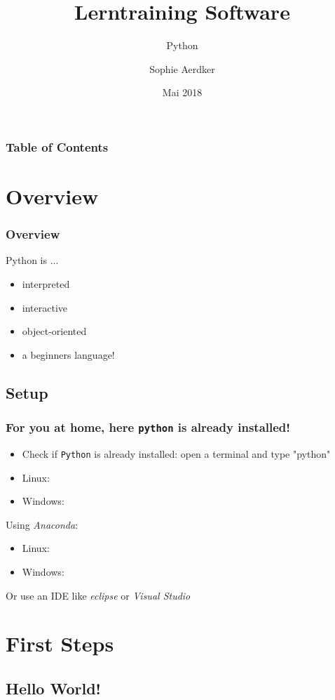 \documentclass{beamer}
\title{Lerntraining Software}
\subtitle{Python}
\author{Sophie Aerdker}
\institute{Ruhr-Universit\"at Bochum}
\date{Mai 2018}
\begin{document}
 
\frame{\titlepage}
\begin{frame}
\frametitle{Table of Contents}
	\tableofcontents
\end{frame}

\section{Overview}

\begin{frame}
\frametitle{Overview}
	Python is ...\\
	\begin{itemize}
		\item interpreted 
		\item interactive 
		\item object-oriented 
		\item a beginners language!
	\end{itemize}
\end{frame}

\subsection{Setup}

\begin{frame}
\frametitle{For you at home, here \texttt{python} is already installed!}
	\begin{itemize}
		\item Check if \texttt{Python} is already installed: open a terminal and type "python"
		\item Linux:
		\item Windows:
	\end{itemize}
	Using \textit{Anaconda}:
	\begin{itemize}
		\item Linux:
		\item Windows:
	\end{itemize}
	Or use an IDE like \textit{eclipse} or \textit{Visual Studio}
\end{frame}

\section{First Steps}
\subsection{Hello World!}
\end{document}
